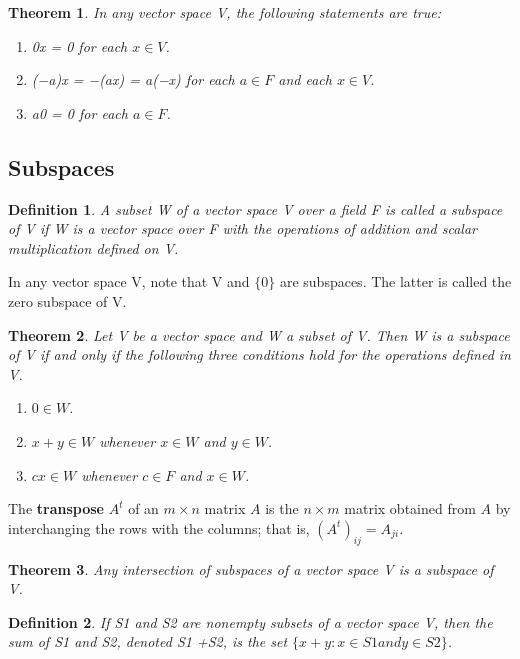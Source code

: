 \documentclass{article}
\newcommand{\bd}[1]{\textbf{#1}}
\theoremstyle{plain}
\newtheorem{theorem}{Theorem}[section]
\newtheorem*{definition1}{Definition}
\theoremstyle{plain} %
\begin{document}
\begin{theorem}
In any vector space V, the following statements are true:
\begin{enumerate}[label=(\alph*)]
\item 0x = 0 for each $x \in V$.
\item (−a)x = −(ax) = a(−x) for each $a \in F$ and each $x \in V$.
\item a0 = 0 for each $a \in  F$.
\end{enumerate}
\end{theorem}

\subsection{Subspaces}

\begin{definition1}
A subset W of a vector space V over a field F is called a
subspace of V if W is a vector space over F with the operations of addition
and scalar multiplication defined on V.
\end{definition1}

In any vector space V, note that V and $\{0\}$ are subspaces. The latter is called the zero subspace of V.

\begin{theorem}
Let V be a vector space and W a subset of V. Then W
is a subspace of V if and only if the following three conditions hold for the
operations defined in V.
\begin{enumerate}[label=(\alph*)]
\item $0 \in W$.
\item $x + y \in W$ whenever $x \in W$ and $y \in W$.
\item $cx \in W$ whenever $c \in F$ and $x \in W$.
\end{enumerate}
\end{theorem}

The \bd{transpose} $A^t$ of an $m \times n$ matrix $A$ is the $n \times m$ matrix obtained from $A$ by interchanging the rows with the columns; that is, $(A^t)_{ij} = A_{ji}$.

\begin{theorem}
Any intersection of subspaces of a vector space V is a subspace of V.
\end{theorem}

\begin{definition1}
If S1 and S2 are nonempty subsets of a vector space V, then the sum of S1 and S2, denoted S1 +S2, is the set $\{x+y : x \in S1 and y \in S2\}$.
\end{definition1}
\end{document}
